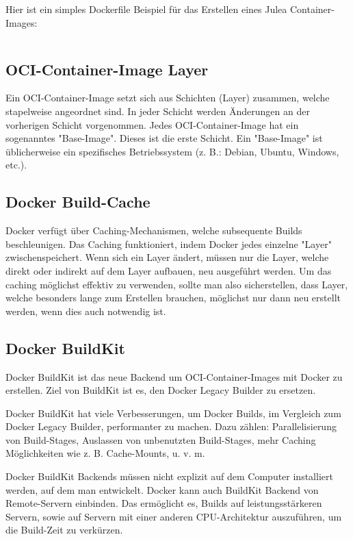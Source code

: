 Hier ist ein simples Dockerfile Beispiel für das Erstellen eines Julea Container-Images:

\inputminted{docker}{./code-examples/Dockerfile.example}

\subsection{OCI-Container-Image Layer}

Ein OCI-Container-Image setzt sich aus Schichten (Layer) zusammen, welche stapelweise angeordnet sind. In jeder Schicht werden Änderungen an der vorherigen Schicht vorgenommen. Jedes OCI-Container-Image hat ein sogenanntes "Base-Image". Dieses ist die erste Schicht. Ein "Base-Image" ist üblicherweise ein spezifisches Betriebssystem (z. B.: Debian, Ubuntu, Windows, etc.).

\subsection{Docker Build-Cache}

Docker verfügt über Caching-Mechanismen, welche subsequente Builds beschleunigen. Das Caching funktioniert, indem Docker jedes einzelne "Layer" zwischenspeichert. Wenn sich ein Layer ändert, müssen nur die Layer, welche direkt oder indirekt auf dem Layer aufbauen, neu ausgeführt werden. Um das caching möglichst effektiv zu verwenden, sollte man also sicherstellen, dass Layer, welche besonders lange zum Erstellen brauchen, möglichst nur dann neu erstellt werden, wenn dies auch notwendig ist.

\subsection{Docker BuildKit}

Docker BuildKit ist das neue Backend um OCI-Container-Images mit Docker zu erstellen. Ziel von BuildKit ist es, den Docker Legacy Builder zu ersetzen.

Docker BuildKit hat viele Verbesserungen, um Docker Builds, im Vergleich zum Docker Legacy Builder, performanter zu machen. Dazu zählen: Parallelisierung von Build-Stages, Auslassen von unbenutzten Build-Stages, mehr Caching Möglichkeiten wie z. B. Cache-Mounts, u. v. m.

Docker BuildKit Backends müssen nicht explizit auf dem Computer installiert werden, auf dem man entwickelt. Docker kann auch BuildKit Backend von Remote-Servern einbinden. Das ermöglicht es, Builds auf leistungsstärkeren Servern, sowie auf Servern mit einer anderen CPU-Architektur auszuführen, um die Build-Zeit zu verkürzen.

